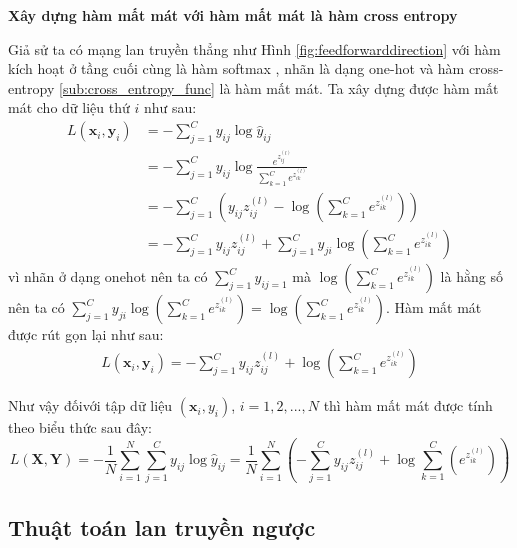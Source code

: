 \textbf{Xây dựng hàm mất mát  với hàm mất mát là hàm cross entropy}\par
Giả sử ta có mạng lan truyền thẳng như Hình \ref{fig:feedforwarddirection} với hàm kích hoạt ở tầng cuối cùng là hàm softmax , nhãn là dạng one-hot và hàm cross-entropy \ref{sub:cross_entropy_func} là hàm mất mát. Ta xây dựng được hàm mất mát cho dữ liệu thứ $i$ như sau:
\begin{equation*}
\begin{split}
L(\textbf{x}_i,\textbf{y}_i) &=-\sum_{j=1}^C y_{ij} \log \widehat{y}_{ij}	\\
&= -\sum_{j = 1}^C y_{ij}\log\frac{e^{z^{(l)}_{ij}}}{\sum_{k=1}^C e^{z^{(l)}_{ik}}}\\
&= -\sum_{j=1}^C\left(y_{ij} z^{(l)}_{ij}-\log(\sum_{k=1}^C e^{z^{(l)}_{ik}})\right) \\
&= -\sum_{j=1}^C y_{ij} z^{(l)}_{ij} + \sum_{j=1}^C y_{ji}\log(\sum_{k=1}^C e^{z^{(l)}_{ik}}) 
\end{split}
\end{equation*}
vì nhãn ở dạng onehot nên ta có  $\sum_{j=1}^C y_{ij = 1}$ mà $\log(\sum_{k=1}^C e^{z^{(l)}_{ik}})$ là hằng số nên ta có $ \sum_{j=1}^C y_{ji}\log(\sum_{k=1}^C e^{z^{(l)}_{ik}}) = \log(\sum_{k=1}^C e^{z^{(l)}_{ik}})$. Hàm mất mát được rút gọn lại như sau:
\begin{align}
\label{eq:cost1}
L(\textbf{x}_i,\textbf{y}_i) = -\sum_{j=1}^C y_{ij} z^{(l)}_{ij} +\log(\sum_{k=1}^C e^{z^{(l)}_{ik}})
\end{align}
\par

Như vậy đốivới tập dữ liệu $(\textbf{x}_i,y_i)$, $i=1,2,...,N$ thì hàm mất mát được tính theo biểu thức sau đây:
\begin{equation}
\label{eq:cost2}
L(\textbf{X},\textbf{Y})
= -\frac{1}{N}\sum_{i=1}^{N}\sum_{j=1}^C y_{ij} \log \widehat{y}_{ij}
=\frac{1}{N} \sum_{i=1}^N \left( - \sum_{j=1}^C y_{ij}z^{(l)}_{ij} + \log\sum_{k=1}^C (e^{z^{(l)}_{ik}}) \right)
\end{equation}

\subsection{Thuật toán lan truyền ngược}
